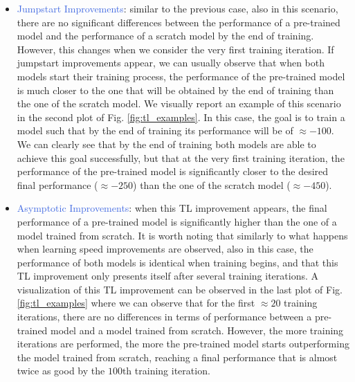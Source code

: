 \begin{itemize}
	\item \textcolor{RoyalBlue}{Jumpstart Improvements}: similar to the previous case, also in this scenario, there are no significant differences between the performance of a pre-trained model and the performance of a scratch model by the end of training. However, this changes when we consider the very first training iteration. If jumpstart improvements appear, we can usually observe that when both models start their training process, the performance of the pre-trained model is much closer to the one that will be obtained by the end of training than the one of the scratch model. We visually report an example of this scenario in the second plot of Fig. \ref{fig:tl_examples}. In this case, the goal is to train a model such that by the end of training its performance will be of $\approx -100$. We can clearly see that by the end of training both models are able to achieve this goal successfully, but that at the very first training iteration, the performance of the pre-trained model is significantly closer to the desired final performance ($\approx -250$) than the one of the scratch model ($\approx -450$). 
	\item \textcolor{RoyalBlue}{Asymptotic Improvements}: when this TL improvement appears, the final performance of a pre-trained model is significantly higher than the one of a model trained from scratch. It is worth noting that similarly to what happens when learning speed improvements are observed, also in this case, the performance of both models is identical when training begins, and that this TL improvement only presents itself after several training iterations. A visualization of this TL improvement can be observed in the last plot of Fig. \ref{fig:tl_examples} where we can observe that for the first $\approx 20$ training iterations, there are no differences in terms of performance between a pre-trained model and a model trained from scratch. However, the more training iterations are performed, the more the pre-trained model starts outperforming the model trained from scratch, reaching a final performance that is almost twice as good by the $100\text{th}$ training iteration.
\end{itemize}



